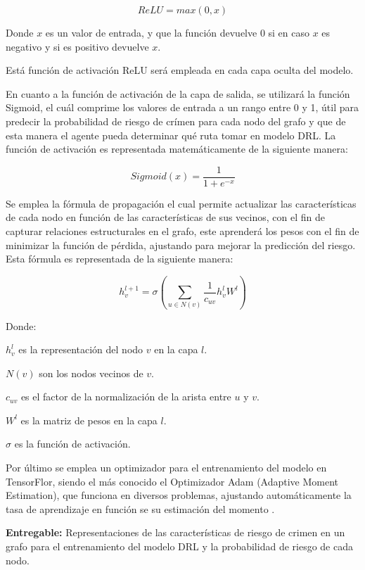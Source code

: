 \begin{itemize}
\begin{equation} 
	ReLU=max(0,x)
\end{equation}

Donde $x$ es un valor de entrada, y que la función devuelve 0 si en caso $x$ es negativo y si es positivo devuelve $x$.

Está función de activación ReLU será empleada en cada capa oculta del modelo.

En cuanto a la función de activación de la capa de salida, se utilizará la función Sigmoid, el cuál comprime los valores de entrada a un rango entre 0 y 1, útil para predecir la probabilidad de riesgo de crímen para cada nodo del grafo y que de esta manera el agente pueda determinar qué ruta tomar en modelo DRL. La función de activación es representada matemáticamente de la siguiente manera:

\begin{equation} 
	Sigmoid(x)=\frac{1}{1+e^{-x}}
\end{equation}

Se emplea la fórmula de propagación el cual permite actualizar las características de cada nodo en función de las características de sus vecinos, con el fin de capturar relaciones estructurales en el grafo, este aprenderá los pesos con el fin de minimizar la función de pérdida, ajustando para mejorar la predicción del riesgo. Esta fórmula es representada de la siguiente manera:

\begin{equation} 
	h_{v}^{l+1}=\sigma (\sum_{u \in  N(v)}\frac{1}{c_{uv}}h_{v}^{l}W^{l})
\end{equation}

Donde:

$h_{v}^{l}$ es la representación del nodo $v$ en la capa $l$.

$N(v)$ son los nodos vecinos de $v$.

$c_{uv}$ es el factor de la normalización de la arista entre $u$ y $v$.

$W^{l}$ es la matriz de pesos en la capa $l$.

$\sigma$ es la función de activación.

Por último se emplea un optimizador para el entrenamiento del modelo en TensorFlor, siendo el más conocido el Optimizador Adam (Adaptive Moment Estimation), que funciona en diversos problemas, ajustando automáticamente la tasa de aprendizaje en función se su estimación del momento \parencite{gl_interactive}.

\textbf{Entregable:} Representaciones de las características de riesgo de crimen en un grafo para el entrenamiento del modelo DRL y la probabilidad de riesgo de cada nodo.


\end{itemize}

